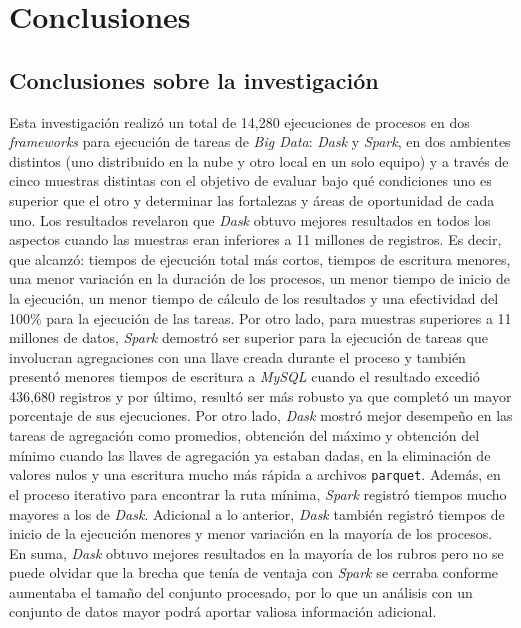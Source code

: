 \chapter*{Conclusiones}


\section{Conclusiones sobre la investigación}

Esta investigación realizó un total de 14,280 ejecuciones de procesos en dos \textit{frameworks} para ejecución de tareas de \textit{Big Data}: \textit{Dask} y \textit{Spark}, en dos ambientes distintos (uno distribuido en la nube y otro local en un solo equipo) y a través de cinco muestras distintas con el objetivo de evaluar bajo qué condiciones uno es superior que el otro y determinar las fortalezas y áreas de oportunidad de cada uno. Los resultados revelaron que \textit{Dask} obtuvo mejores resultados en todos los aspectos cuando las muestras eran inferiores a 11 millones de registros. Es decir, que alcanzó: tiempos de ejecución total más cortos, tiempos de escritura menores, una menor variación en la duración de los procesos, un menor tiempo de inicio de la ejecución, un menor tiempo de cálculo de los resultados y una efectividad del 100\% para la ejecución de las tareas. Por otro lado, para muestras superiores a 11 millones de datos, \textit{Spark} demostró ser superior para la ejecución de tareas que involucran agregaciones con una llave creada durante el proceso y también presentó menores tiempos de escritura a \textit{MySQL} cuando el resultado excedió 436,680 registros y por último, resultó ser más robusto ya que completó un mayor porcentaje de sus ejecuciones. Por otro lado, \textit{Dask} mostró mejor desempeño en las tareas de agregación como promedios, obtención del máximo y obtención del mínimo cuando las llaves de agregación ya estaban dadas, en la eliminación de valores nulos y una escritura mucho más rápida a archivos \texttt{parquet}. Además, en el proceso iterativo para encontrar la ruta mínima, \textit{Spark} registró tiempos mucho mayores a los de \textit{Dask}. Adicional a lo anterior, \textit{Dask} también registró tiempos de inicio de la ejecución menores y menor variación en la mayoría de los procesos.  En suma, \textit{Dask} obtuvo mejores resultados en la mayoría de los rubros pero no se puede olvidar que la brecha que tenía de ventaja con \textit{Spark} se cerraba conforme aumentaba el tamaño del conjunto procesado, por lo que un análisis con un conjunto de datos mayor podrá aportar valiosa información adicional.

